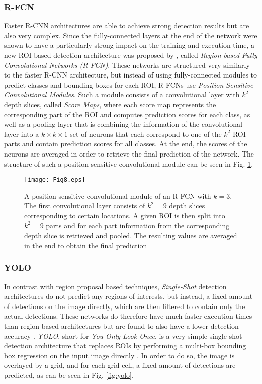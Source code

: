 \documentclass[conference]{IEEEtran}
\begin{document}
\subsubsection{R-FCN}
Faster R-CNN architectures are able to achieve strong detection results but are also very complex. Since the fully-connected layers at the end of the network were shown to have a particularly strong impact on the training and execution time, a new ROI-based detection architecture was proposed by \cite{RFCN}, called \emph{Region-based Fully Convolutional Networks (R-FCN)}. These networks are structured very similarly to the faster R-CNN architecture, but instead of using fully-connected modules to predict classes and bounding boxes for each ROI, R-FCNs use \emph{Position-Sensitive Convolutional Modules}. Such a module consists of a convolutional layer with $k^2$ depth slices, called \emph{Score Maps}, where each score map represents the corresponding part of the ROI and computes prediction scores for each class, as well as a pooling layer that is combining the information of the convolutional layer into a $k \times k \times 1$ set of neurons that each correspond to one of the $k^2$ ROI parts and contain prediction scores for all classes. At the end, the scores of the neurons are averaged in order to retrieve the final prediction of the network. The structure of such a position-sensitive convolutional module can be seen in Fig. \ref{fig:rfcn}.

\begin{figure}
\texttt{[image: Fig8.eps]}
\caption{A position-sensitive convolutional module of an R-FCN with $k=3$. The first convolutional layer consists of $k^2=9$ depth slices corresponding to certain locations. A given ROI is then split into $k^2=9$ parts and for each part information from the corresponding depth slice is retrieved and pooled. The resulting values are averaged in the end to obtain the final prediction}
\label{fig:rfcn}
\end{figure}

\subsubsection{YOLO}
In contrast with region proposal based techniques, \emph{Single-Shot} detection architectures do not predict any regions of interests, but instead, a fixed amount of detections on the image directly, which are then filtered to contain only the actual detections. These networks do therefore have much faster execution times than region-based architectures but are found to also have a lower detection accuracy \cite{RFCN}.
\emph{YOLO}, short for \emph{You Only Look Once}, is a very simple single-shot detection architecture that replaces ROIs by performing a multi-box bounding box regression on the input image directly \cite{YOLO}. In order to do so, the image is overlayed by a grid, and for each grid cell, a fixed amount of detections are predicted, as can be seen in Fig. \ref{fig:yolo}.
\end{document}
